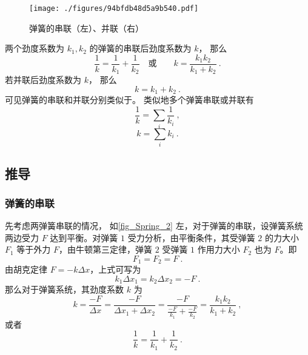

\begin{figure}[ht]
\centering
\texttt{[image: ./figures/94bfdb48d5a9b540.pdf]}
\caption{弹簧的串联（左）、并联（右）} \label{fig_Spring_2}
\end{figure}
两个劲度系数为 $k_1, k_2$ 的弹簧的串联后劲度系数为 $k$， 那么
\begin{equation}
\frac{1}{k} = \frac{1}{k_1} + \frac{1}{k_2}
\quad \text{或} \qquad
k = \frac{k_1 k_2}{k_1 + k_2}~.
\end{equation}
若并联后劲度系数为 $k$， 那么
\begin{equation}
k = k_1 + k_2~.
\end{equation}
可见弹簧的串联和并联分别类似于。 类似地多个弹簧串联或并联有
\begin{equation}\label{eq_Spring_2}
\frac{1}{k} = \sum_i \frac{1}{k_i}~,
\end{equation}
\begin{equation}\label{eq_Spring_3}
k = \sum_i k_i~.
\end{equation}

\subsection{推导}
\subsubsection{弹簧的串联}
先考虑两弹簧串联的情况，
如\autoref{fig_Spring_2} 左，对于弹簧的串联，设弹簧系统两边受力 $F$ 达到平衡。对弹簧 $1$ 受力分析，由平衡条件，其受弹簧 $2$ 的力大小 $F_1$ 等于外力 $F$，由牛顿第三定律，弹簧 $2$ 受弹簧 $1$ 作用力大小 $F_2$ 也为 $F$。即
\begin{equation}
F_1=F_2=F~.
\end{equation}
由胡克定律 $F=-k\Delta x$，上式可写为
\begin{equation}
k_1\Delta x_1=k_2\Delta x_2=-F~.
\end{equation}
那么对于弹簧系统，其劲度系数 $k$ 为
\begin{equation}
k=\frac{-F}{\Delta x}=\frac{-F}{\Delta x_1+\Delta x_2}=\frac{-F}{\frac{-F}{k_1}+\frac{-F}{k_2}}=\frac{k_1k_2}{k_1+k_2}~,
\end{equation}
或者
\begin{equation}
\frac{1}{k}=\frac{1}{k_1}+\frac{1}{k_2}~.
\end{equation}

